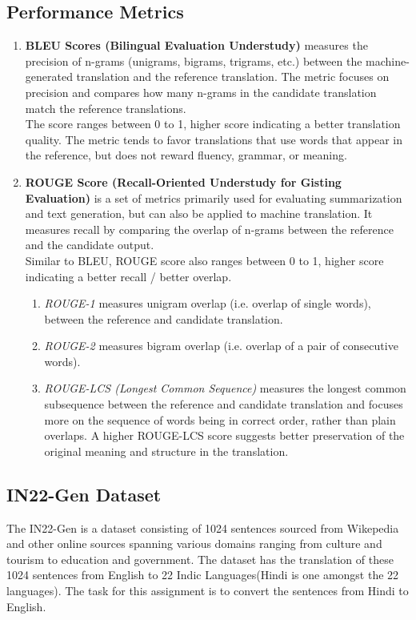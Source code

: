 \documentclass{article}
\begin{document}
\subsection{Performance Metrics}
\begin{enumerate}
    \item \textbf{BLEU Scores (Bilingual Evaluation Understudy)} measures the precision of n-grams (unigrams, bigrams, trigrams, etc.) between the machine-generated translation and the reference translation. The metric focuses on precision and compares how many n-grams in the candidate translation match the reference translations.\\
    The score ranges between 0 to 1, higher score indicating a better translation quality. The metric tends to favor translations that use words that appear in the reference, but does not reward fluency, grammar, or meaning.

    \item \textbf{ROUGE Score (Recall-Oriented Understudy for Gisting Evaluation)} is a set of metrics primarily used for evaluating summarization and text generation, but can also be applied to machine translation. It measures recall by comparing the overlap of n-grams between the reference and the candidate output.\\
    Similar to BLEU, ROUGE score also ranges between 0 to 1, higher score indicating a better recall / better overlap.
    \begin{enumerate}
        \item \textit{ROUGE-1} measures unigram overlap (i.e. overlap of single words), between the reference and candidate translation.
        \item \textit{ROUGE-2} measures bigram overlap (i.e. overlap of a pair of consecutive words).
        \item \textit{ROUGE-LCS (Longest Common Sequence)} measures the longest common subsequence between the reference and candidate translation and focuses more on the sequence of words being in correct order, rather than plain overlaps. A higher ROUGE-LCS score suggests better preservation of the original meaning and structure in the translation.

    \end{enumerate}
\end{enumerate}

\subsection{IN22-Gen Dataset}
The IN22-Gen is a dataset consisting of 1024 sentences sourced from Wikepedia and other online sources spanning various domains ranging from culture and tourism to education and government. The dataset has the translation of these 1024 sentences from English to 22 Indic Languages(Hindi is one amongst the 22 languages). The task for this assignment is to convert the sentences from Hindi to English.
\end{document}
